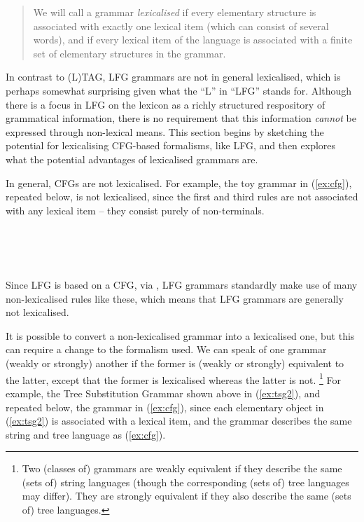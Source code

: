 \documentclass[output=paper,hidelinks]{langscibook}
\begin{document}
\begin{quote}
  We will call a grammar \emph{lexicalised} if every elementary structure is
  associated with exactly one lexical item (which can consist of several words),
  and if every lexical item of the language is associated with a finite set of
  elementary structures in the grammar.
\end{quote}
In contrast to (L)TAG, LFG grammars are not in general lexicalised, which is
perhaps somewhat surprising given what the ``L'' in ``LFG'' stands for. Although
there is a focus in LFG on the lexicon as a richly structured respository of
grammatical information, there is no requirement that this information
\emph{cannot} be expressed through non-lexical means. This section begins by
sketching the potential for lexicalising CFG-based formalisms, like LFG, and
then explores what the potential advantages of lexicalised grammars are.

In general, CFGs are not lexicalised. For example, the toy grammar in
(\ref{ex:cfg}), repeated below, is not lexicalised, since the first and third
rules are not associated with any lexical item -- they consist purely of
non-terminals.

\begin{exe}
  \exi{(\ref{ex:cfg})}
  \\
  \\
  \\
\end{exe}
%
Since LFG is based on a CFG, via \cstruc, LFG grammars standardly make use of
many non-lexicalised rules like these, which means that LFG grammars are
generally not lexicalised.

It is possible to convert a non-lexicalised grammar into a lexicalised one, but
this can require a change to the formalism used. We can speak of one grammar
(weakly or strongly)  another if the former is (weakly or
strongly) equivalent to the latter, except that the former is lexicalised
whereas the latter is not.%
%
\footnote{Two (classes of) grammars are weakly equivalent if they describe the
  same (sets of) string languages (though the corresponding (sets of) tree
  languages may differ). They are strongly equivalent if they also describe the
  same (sets of) tree languages.}
%
For example, the Tree Substitution Grammar shown above in (\ref{ex:tsg2}), and
repeated below,  the grammar in (\ref{ex:cfg}), since
each elementary object in (\ref{ex:tsg2}) is associated with a lexical item, and
the grammar describes the same string and tree language as (\ref{ex:cfg}).
\end{document}

